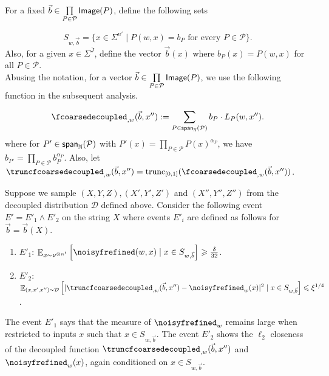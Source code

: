 \documentclass[11pt]{article}
\newcommand\Expect[2]{{\mathop{\mathbb{E}}_{#1}\left[ {#2} \right]}}
\newcommand\spn{{\sf span}_{\mathbb{N}}}
\renewcommand\geq{\geqslant}
\renewcommand\leq{\leqslant}
\newcommand{\V}[1]{{#1}}
\begin{document}
  
For a fixed $\vec{b}\in\prod\limits_{P\in\mathcal{P}}{\sf Image}(P)$, define the following sets

$$S_{\V w, \vec{b}} = \{ x\in \Sigma^{n'} \mid P(\V w,\V x) = b_P \mbox{ for every } P\in \mathcal{P}\}.$$
%
Also, for a given $\V x\in \Sigma^{\bar{J}}$, define the vector $\vec{b}(\V x)$ where $b_P(\V x) = P(\V w, \V x)$ for all $P\in \mathcal{P}$.\\

Abusing the notation, for a vector $\vec{b}\in\prod\limits_{P\in\mathcal{P}}{\sf Image}(P)$, we use the following function in the subsequent analysis.

$$\fcoarsedecoupled_{, \V w}(\vec{b}, \V x'') := \sum\limits_{P\in\spn(\mathcal{P})} b_P \cdot L_P(\V w, \V x'').$$
%
where for $P'\in\spn(\mathcal{P})$ with $P'(x) = \prod\limits_{P\in\mathcal{P}}P(x)^{\alpha_{P}}$, we have $b_{P'} = \prod\limits_{P\in\mathcal{P}}b_P^{\alpha_{P}}$. Also, let $\truncfcoarsedecoupled_{,\V w}(\vec{b},\V x'') = \mathrm{trunc}_{[0,1]}(\fcoarsedecoupled_{,\V w}(\vec{b},\V x''))$.

Suppose we sample $(X, Y, Z), (X', Y', Z')$ and $(X'', Y'', Z'')$ from the decoupled distribution $\mathcal{D}$ defined above. Consider the following event $E' = E'_1\wedge E'_2$ on the string $X$ where events $E'_i$ are defined as follows for $\vec{b} = \vec{b}(X)$.

\begin{enumerate}
    \item\label{event:E'1} $E'_1$: $\Expect{\V x\sim \nu^{\otimes n'}}{\noisyfrefined(\V w, \V x) \mid \V x\in S_{\V w, \vec{b}}}\geq \frac{\delta}{32}$.
    \item\label{event:E'2} $E'_2$: $\Expect{(\V x, \V x', \V x'')\sim \mathcal{D}}{|\truncfcoarsedecoupled_{,\V w}(\vec{b},\V x'')  - \noisyfrefined_{\V w}(\V x)|^2 \mid \V x\in S_{\V w, \vec{b}}} \leq \xi^{1/4}$.
\end{enumerate}

The event $E'_1$ says that the measure of $\noisyfrefined_{\V w}$ remains large when restricted to inputs $x$ such that $x\in S_{\V w, \vec{b}}$. The event $E'_2$ shows the $\ell_2$ closeness of the decoupled function $\truncfcoarsedecoupled_{,\V w}(\vec{b},\V x'')$ and $\noisyfrefined_{\V w}(\V x)$, again conditioned on $x\in S_{\V w, \vec{b}}$.
\end{document}
